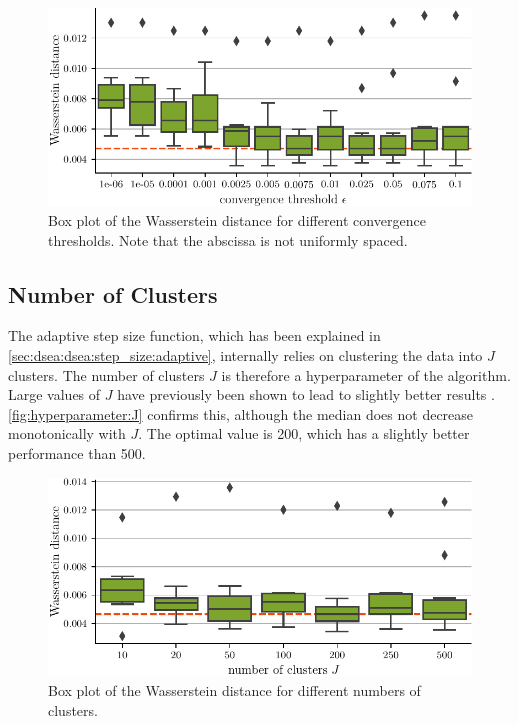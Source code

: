 \begin{figure}
  \centering
  \includegraphics[width=\textwidth]{content/plots/hyperparam/epsilon_vs_wd_boxplot_lessheight.pdf}
  \caption{
    Box plot of the Wasserstein distance for different convergence thresholds.
    Note that the abscissa is not uniformly spaced.
  }
  \label{fig:hyperparameter:epsilon}
\end{figure}


\subsection{Number of Clusters}
The adaptive step size function,
  which has been explained in \autoref{sec:dsea:dsea:step_size:adaptive}, %
internally relies on clustering the data into $J$ clusters.
The number of clusters $J$ is therefore a hyperparameter of the algorithm.
%
Large values of $J$ have previously been shown to lead to slightly better results \cite{dsea_mirko}.
\autoref{fig:hyperparameter:J} confirms this,
although the median does not decrease monotonically with $J$.
The optimal value is \num{200},
which has a slightly better performance than \num{500}.

\begin{figure}
  \centering
  \includegraphics[scale=1]{content/plots/hyperparam/J_vs_wd_boxplot_lessheight.pdf}
  \caption{Box plot of the Wasserstein distance for different numbers of clusters.}
  \label{fig:hyperparameter:J}
\end{figure}


